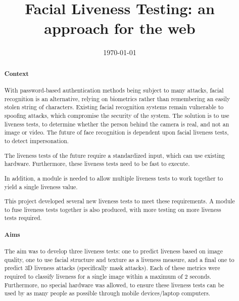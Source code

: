 \documentclass[12pt,a4paper]{article}
\title{Facial Liveness Testing: an approach for the web}
\author{} %
\date{\today}
\begin{document}
\maketitle
\begin{abstract}
\paragraph{Context}
With password-based authentication methods being subject to many attacks, facial recognition is an alternative, relying on biometrics rather than remembering an easily stolen string of characters.
Existing facial recognition systems remain vulnerable to spoofing attacks, which compromise the security of the system. The solution is to use liveness tests, to determine whether the person behind the camera is real, and not an image or video. The future of face recognition is dependent upon facial liveness tests, to detect impersonation. 

The liveness tests of the future require a standardized input, which can use existing hardware. Furthermore, these liveness tests need to be fast to execute.

In addition, a module is needed to allow multiple liveness tests to work together to yield a single liveness value.

This project developed several new liveness tests to meet these requirements. A module to fuse liveness tests together is also produced, with more testing on more liveness tests required.

\paragraph{Aims}
    The aim was to develop three liveness tests: one to predict liveness based on image quality, one to use facial structure and texture as a liveness measure,
    and a final one to predict 3D liveness attacks (specifically mask attacks). Each of these metrics were required to classify liveness for a single image within a maximum of 2 seconds.
    Furthermore, no special hardware was allowed, to ensure these liveness tests can be used by as many people as possible through mobile devices/laptop computers.
 

\end{abstract}
\end{document}
